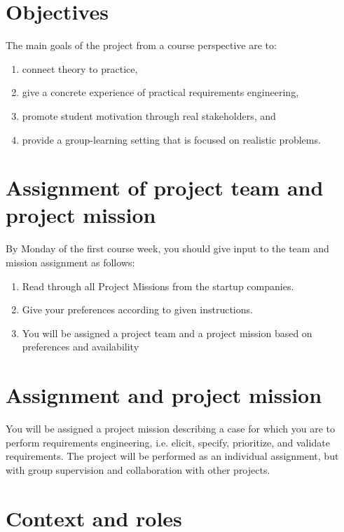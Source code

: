 \maketitle
\vspace{-1cm}

\section{Objectives}
The main goals of the project from a course perspective are to:
\begin{enumerate}[noitemsep]
\item connect theory to practice,
\item give a concrete experience of practical requirements engineering,
\item promote student motivation through real stakeholders, and
\item provide a group-learning setting that is focused on realistic problems.
\end{enumerate}

\ifteknolog
   \section{Assignment of project team and project mission}
   By Monday of the first course week, you should give input to the team and mission
assignment as follows:
\begin{enumerate}[noitemsep]
   \item Read through all Project Missions from the startup companies.
   \item  Give your preferences according to given instructions.
   \item  You will be assigned a project team and a project mission based on preferences
   and availability
\end{enumerate}
\else
   \section{Assignment and project mission}
   You will be assigned a project mission describing a case for which you are to perform requirements engineering, i.e. elicit, specify, prioritize, and validate requirements. The project will be performed as an individual assignment, but with group supervision and collaboration with other projects.
\fi

\ifteknolog
   \section{Context and roles}

